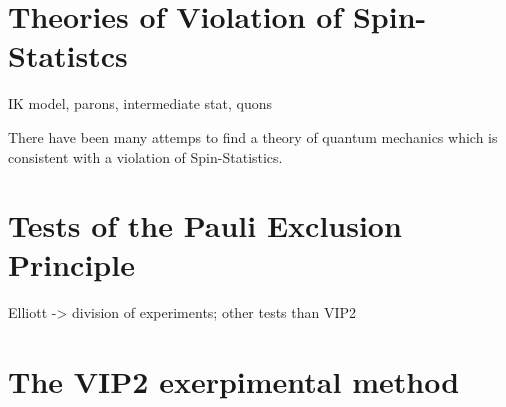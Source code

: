 \section{Theories of Violation of Spin-Statistcs}

IK model, parons, intermediate stat, quons

There have been many attemps to find a theory of quantum mechanics which is consistent with a violation of Spin-Statistics. 

\section{Tests of the Pauli Exclusion Principle}

Elliott -> division of experiments; other tests than VIP2

\section{The VIP2 exerpimental method}